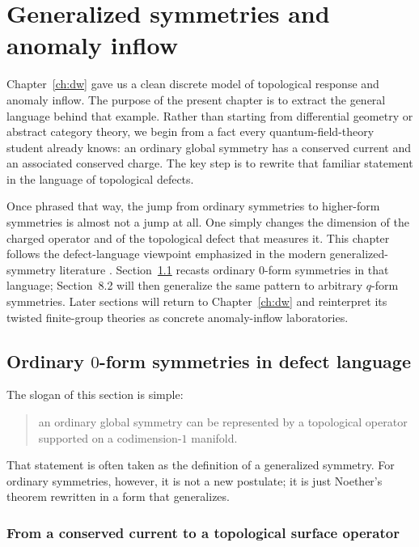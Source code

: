 \chapter{Generalized symmetries and anomaly inflow}\label{ch:gensym}

Chapter~\ref{ch:dw} gave us a clean discrete model of topological response and anomaly inflow. The purpose of the present chapter is to extract the general language behind that example. Rather than starting from differential geometry or abstract category theory, we begin from a fact every quantum-field-theory student already knows: an ordinary global symmetry has a conserved current and an associated conserved charge. The key step is to rewrite that familiar statement in the language of topological defects.

\medskip

\noindent Once phrased that way, the jump from ordinary symmetries to higher-form symmetries is almost not a jump at all. One simply changes the dimension of the charged operator and of the topological defect that measures it. This chapter follows the defect-language viewpoint emphasized in the modern generalized-symmetry literature \cite{GKSW2015,Bhardwaj2023Lectures}. Section~\ref{sec:zero-form-defects} recasts ordinary $0$-form symmetries in that language; Section~8.2 will then generalize the same pattern to arbitrary $q$-form symmetries. Later sections will return to Chapter~\ref{ch:dw} and reinterpret its twisted finite-group theories as concrete anomaly-inflow laboratories.

\section{Ordinary \texorpdfstring{$0$}{0}-form symmetries in defect language}\label{sec:zero-form-defects}

The slogan of this section is simple:
\begin{quote}
an ordinary global symmetry can be represented by a topological operator supported on a codimension-$1$ manifold.
\end{quote}
That statement is often taken as the definition of a generalized symmetry. For ordinary symmetries, however, it is not a new postulate; it is just Noether's theorem rewritten in a form that generalizes.

\subsection{From a conserved current to a topological surface operator}

